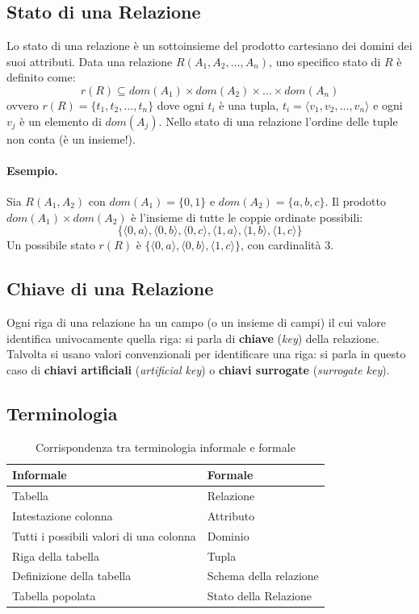 \documentclass[12pt, a4paper]{article}
\begin{document}
\subsection{Stato di una Relazione}

Lo stato di una relazione è un sottoinsieme del prodotto cartesiano dei domini dei suoi attributi. Data una relazione $R(A_1, A_2, \ldots, A_n)$, uno specifico stato di $R$ è definito come:
$$r(R) \subseteq dom(A_1) \times dom(A_2) \times \ldots \times dom(A_n)$$
ovvero $r(R) = \{t_1, t_2, \ldots, t_n\}$ dove ogni $t_i$ è una tupla, $t_i = \langle v_1, v_2, \ldots, v_n \rangle$ e ogni $v_j$ è un elemento di $dom(A_j)$. Nello stato di una relazione l'ordine delle tuple non conta (è un insieme!).

\paragraph{Esempio.} Sia $R(A_1, A_2)$ con $dom(A_1) = \{0,1\}$ e $dom(A_2) = \{a,b,c\}$. Il prodotto $dom(A_1) \times dom(A_2)$ è l'insieme di tutte le coppie ordinate possibili:
$$\{\langle 0,a \rangle, \langle 0,b \rangle, \langle 0,c \rangle, \langle 1,a \rangle, \langle 1,b \rangle, \langle 1,c \rangle\}$$
Un possibile stato $r(R)$ è $\{\langle 0,a \rangle, \langle 0,b \rangle, \langle 1,c \rangle\}$, con cardinalità 3.

\subsection{Chiave di una Relazione}

Ogni riga di una relazione ha un campo (o un insieme di campi) il cui valore identifica univocamente quella riga: si parla di \textbf{chiave} (\textit{key}) della relazione. Talvolta si usano valori convenzionali per identificare una riga: si parla in questo caso di \textbf{chiavi artificiali} (\textit{artificial key}) o \textbf{chiavi surrogate} (\textit{surrogate key}).

\subsection{Terminologia}

\begin{table}[H]
\centering
\begin{tabular}{@{}ll@{}}
\toprule
\textbf{Informale} & \textbf{Formale} \\
\midrule
Tabella & Relazione \\
Intestazione colonna & Attributo \\
Tutti i possibili valori di una colonna & Dominio \\
Riga della tabella & Tupla \\
Definizione della tabella & Schema della relazione \\
Tabella popolata & Stato della Relazione \\
\bottomrule
\end{tabular}
\caption{Corrispondenza tra terminologia informale e formale}
\end{table}
\end{document}
